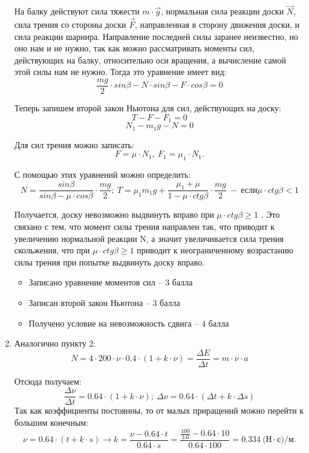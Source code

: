 \begin{enumerate}
    На балку действуют сила тяжести $m \cdot \overrightarrow{g}$, нормальная сила реакции доски $\overrightarrow{N}$, сила трения со стороны доски $\overrightarrow{F}$, направленная в сторону движения доски, и сила реакции шарнира. Направление последней силы заранее неизвестно, но оно нам и не нужно, так как можно рассматривать моменты сил, действующих на балку, относительно оси вращения, а вычисление самой этой силы нам не нужно. Тогда это уравнение имеет вид:
    $$\frac{mg}{2} \cdot sin \beta - N \cdot sin \beta -F \cdot cos \beta =0$$

    Теперь запишем второй закон Ньютона для сил, действующих на доску:
    $$T-F-F_1=0$$
    $$N_1-m_1 g-N=0$$
    
    Для сил трения можно записать: $$F=\mu \cdot N_1,\: F_1= \mu_1 \cdot N_1.$$

    С помощью этих уравнений можно определить:
    $$N=\frac{sin\beta}{sin \beta -\mu \cdot cos \beta} \cdot \frac{mg}{2}; \: T= \mu_1 m_1 g+\frac{\mu_1+\mu}{1-\mu \cdot ctg \beta} \cdot \frac{mg}{2}\:-\: \text{если} \mu \cdot ctg \beta < 1$$  
    
    Получается, доску невозможно выдвинуть вправо при $\mu \cdot ctg \beta \geq 1$ . Это связано с тем, что момент силы трения направлен так, что приводит к увеличению нормальной реакции N, а значит увеличивается сила трения скольжения, что при $\mu \cdot ctg \beta \geq 1$ приводит к неограниченному возрастанию силы трения при попытке выдвинуть доску вправо.

    \markSection

    \begin{itemize}
        \item Записано уравнение моментов сил – 3 балла
        \item Записан второй закон Ньютона – 3 балла
        \item Получено условие на невозможность сдвига – 4 балла 
    \end{itemize}

    \item Аналогично пункту 2:
    $$N=4 \cdot 200 \cdot \nu \cdot 0.4 \cdot (1+k \cdot \nu)=\frac{\Delta E}{\Delta t}=m \cdot \nu \cdot a$$

    Отсюда получаем:
    $$\frac{\Delta \nu}{\Delta t}=0.64 \cdot (1+k \cdot \nu); \: \Delta \nu=0.64 \cdot (\Delta t+k \cdot \Delta s)$$    
    Так как коэффициенты постоянны, то от малых приращений можно перейти к большим конечным:  $$\nu=0.64 \cdot (t+k \cdot s) \rightarrow k=\frac{\nu-0.64 \cdot t}{0.64 \cdot s}=\frac{\frac{100}{3.6}-0.64 \cdot 10}{0.64 \cdot 100}=0.334  \: \text{(Н} \cdot \text{с)/м} .$$
    

\end{enumerate}
